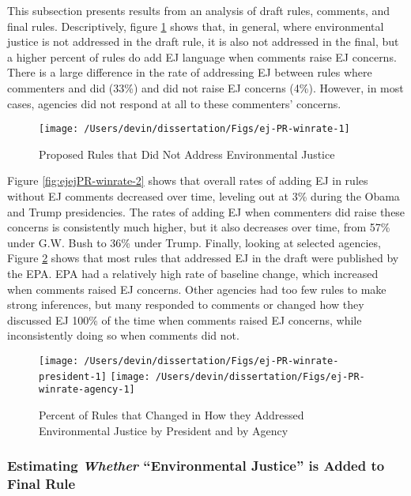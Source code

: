\documentclass[
      12pt,
        ]{article}
\begin{document}
This subsection presents results from an analysis of draft
rules, comments, and final rules. Descriptively, figure
\ref{fig:ej-PR-winrate-1}
shows that, in general, where environmental
justice is not addressed in the draft rule, it is also not addressed in the final, but a higher percent of rules do add EJ language when comments raise EJ concerns. There is a large difference in the rate of addressing EJ between rules where commenters and did (33\%) and did not raise EJ concerns (4\%). However, in most cases, agencies did not respond at all to these commenters' concerns.

\begin{figure}

{\centering \texttt{[image: /Users/devin/dissertation/Figs/ej-PR-winrate-1]} 

}

\caption{Proposed Rules that Did Not Address Environmental Justice}\label{fig:ej-PR-winrate-1}
\end{figure}

Figure \ref{fig:ejejPR-winrate-2} shows that overall rates of adding EJ in rules without EJ comments decreased over time, leveling out at 3\% during the Obama and Trump presidencies. The rates of adding EJ when commenters did raise these concerns is consistently much higher, but it also decreases over time, from 57\% under G.W. Bush to 36\% under Trump.
Finally, looking at selected agencies, Figure \ref{fig:ej-PR-winrate-2} shows that most rules that addressed EJ in the draft were published by the EPA. EPA had a relatively high rate of baseline change, which increased when comments raised EJ concerns. Other agencies had too few rules to make strong inferences, but many responded to comments or changed how they discussed EJ 100\% of the time when comments raised EJ concerns, while inconsistently doing so when comments did not.

\begin{figure}

{\centering \texttt{[image: /Users/devin/dissertation/Figs/ej-PR-winrate-president-1]} \texttt{[image: /Users/devin/dissertation/Figs/ej-PR-winrate-agency-1]} 

}

\caption{Percent of Rules that Changed in How they Addressed Environmental Justice by President and by Agency}\label{fig:ej-PR-winrate-2}
\end{figure}

\hypertarget{estimating-whether-environmental-justice-is-added-to-final-rule}{%
\subsubsection{\texorpdfstring{Estimating \emph{Whether} ``Environmental Justice'' is Added to Final Rule}{Estimating Whether ``Environmental Justice'' is Added to Final Rule}}\label{estimating-whether-environmental-justice-is-added-to-final-rule}}
\end{document}
